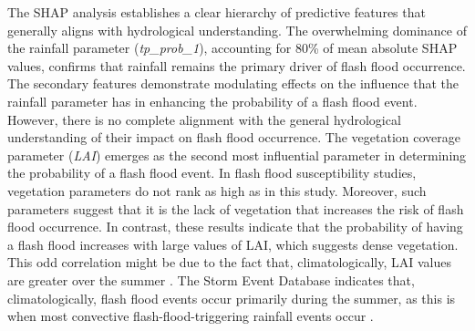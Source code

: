 The  SHAP analysis establishes a clear hierarchy of predictive features that generally aligns with hydrological understanding. The overwhelming dominance of the rainfall parameter (\textit{tp\_prob\_1}), accounting for 80\% of mean absolute SHAP values, confirms that rainfall remains the primary driver of flash flood occurrence. The secondary features demonstrate modulating effects on the influence that the rainfall parameter has in enhancing the probability of a flash flood event. However, there is no complete alignment with the general hydrological understanding of their impact on flash flood occurrence. The vegetation coverage parameter (\textit{LAI}) emerges as the second most influential parameter in determining the probability of a flash flood event. In flash flood susceptibility studies, vegetation parameters do not rank as high as in this study. Moreover, such parameters suggest that it is the lack of vegetation that increases the risk of flash flood occurrence. In contrast, these results indicate that the probability of having a flash flood increases with large values of LAI, which suggests dense vegetation. This odd correlation might be due to the fact that, climatologically, LAI values are greater over the summer \citep{Owens_2018}. The Storm Event Database indicates that, climatologically, flash flood events occur primarily during the summer, as this is when most convective flash-flood-triggering rainfall events occur \citep{Davis_2001}. 


